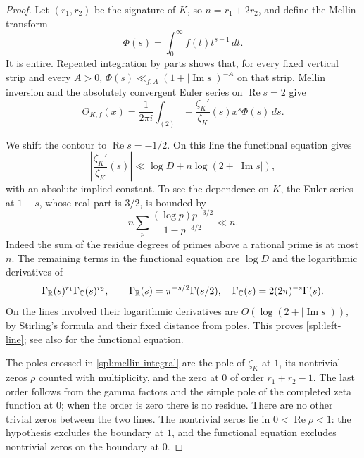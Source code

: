 \begin{proof}
Let $(r_1,r_2)$ be the signature of $K$, so $n=r_1+2r_2$, and define
the Mellin transform
\[
 \Phi(s)=\int_0^\infty f(t)t^{s-1}\,dt.
\]
It is entire. Repeated integration by parts shows that, for every fixed
vertical strip and every $A>0$,
$\Phi(s)\ll_{f,A}(1+|\operatorname{Im}s|)^{-A}$ on that strip.
Mellin inversion and the absolutely convergent Euler series on
$\operatorname{Re}s=2$ give
\begin{equation}
 \Theta_{K,f}(x)
 =\frac1{2\pi i}\int_{(2)}
       -\frac{\zeta_K'}{\zeta_K}(s)x^s\Phi(s)\,ds.
 \label{spl:mellin-integral}
\end{equation}

We shift the contour to $\operatorname{Re}s=-1/2$.
On this line the functional equation gives
\begin{equation}
 \left|\frac{\zeta_K'}{\zeta_K}(s)\right|
 \ll \log D+n\log(2+|\operatorname{Im}s|),
 \label{spl:left-line}
\end{equation}
with an absolute implied constant. To see the dependence on $K$, the
Euler series at $1-s$, whose real part is $3/2$, is bounded by
\[
 n\sum_{p}\frac{(\log p)p^{-3/2}}{1-p^{-3/2}}\ll n.
\]
Indeed the sum of the residue degrees of primes above a rational prime
is at most $n$. The remaining terms in the functional equation are
$\log D$ and the logarithmic derivatives of
\[
 \Gamma_{\mathbb{R}}(s)^{r_1}\Gamma_{\mathbb{C}}(s)^{r_2},\qquad
 \Gamma_{\mathbb{R}}(s)=\pi^{-s/2}\Gamma(s/2),\quad
 \Gamma_{\mathbb{C}}(s)=2(2\pi)^{-s}\Gamma(s).
\]
On the lines involved their logarithmic derivatives are
$O(\log(2+|\operatorname{Im}s|))$, by Stirling's formula and their
fixed distance from poles. This proves \eqref{spl:left-line}; see also
\cite[Main Theorem~4.4.1 and \S4.5]{Tate67} for the functional equation.

The poles crossed in \eqref{spl:mellin-integral} are the pole of
$\zeta_K$ at $1$, its nontrivial zeros $\rho$ counted with multiplicity,
and the zero at $0$ of
order $r_1+r_2-1$. The last order follows from the gamma factors and
the simple pole of the completed zeta function at $0$; when the order
is zero there is no residue. There are no other trivial zeros between
the two lines. The nontrivial zeros lie in $0<\operatorname{Re}\rho<1$:
the hypothesis excludes the boundary at $1$, and the functional equation
excludes nontrivial zeros on the boundary at $0$.


\end{proof}
